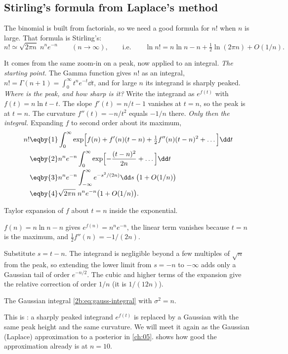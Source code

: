 \subsection{Stirling's formula from Laplace's method}
\label{2b:sec:stirling}

The binomial is built from factorials, so we need a good formula for $n!$ when $n$ is large. That formula is Stirling's:
\begin{equation}
  n! \simeq \sqrt{2\pi n}\;n^n e^{-n}\qquad (n\to\infty),
  \qquad\text{i.e.}\qquad
  \ln n! = n\ln n-n+\tfrac12\ln(2\pi n)+O(1/n) .
  \label{2b:eq:stirling}
\end{equation}

It comes from the same zoom-in on a peak, now applied to an integral. \emph{The starting point.} The Gamma function gives $n!$ as an integral, $n!=\Gamma(n+1)=\int_0^\infty t^n e^{-t}\dd t$, and for large $n$ its integrand is sharply peaked. \emph{Where is the peak, and how sharp is it?} Write the integrand as $e^{f(t)}$ with $f(t)=n\ln t-t$. The slope $f'(t)=n/t-1$ vanishes at $t=n$, so the peak is at $t=n$. The curvature $f''(t)=-n/t^2$ equals $-1/n$ there. \emph{Only then the integral.} Expanding $f$ to second order about its maximum,
\begin{align}
  n!
  &\eqby{1} \int_0^\infty \exp\Bigl[f(n)+f'(n)(t-n)+\tfrac12 f''(n)(t-n)^2+\dots\Bigr]\dd t \nonumber\\
  &\eqby{2} n^n e^{-n}\int_0^\infty \exp\Bigl[-\frac{(t-n)^2}{2n}+\dots\Bigr]\dd t \nonumber\\
  &\eqby{3} n^n e^{-n}\int_{-\infty}^{\infty} e^{-s^2/(2n)}\dd s\;\bigl(1+O(1/n)\bigr) \nonumber\\
  &\eqby{4} \sqrt{2\pi n}\;n^n e^{-n}\bigl(1+O(1/n)\bigr) .
  \label{2b:eq:stirling-derivation}
\end{align}
\begin{explain}
  \item Taylor expansion of $f$ about $t=n$ inside the exponential.
  \item $f(n)=n\ln n-n$ gives $e^{f(n)}=n^ne^{-n}$, the linear term vanishes because $t=n$ is the maximum, and $\tfrac12f''(n)=-1/(2n)$.
  \item Substitute $s=t-n$. The integrand is negligible beyond a few multiples of $\sqrt n$ from the peak, so extending the lower limit from $s=-n$ to $-\infty$ adds only a Gaussian tail of order $e^{-n/2}$. The cubic and higher terms of the expansion give the relative correction of order $1/n$ (it is $1/(12n)$).
  \item The Gaussian integral \eqref{2b:eq:gauss-integral} with $\sigma^2=n$.
\end{explain}
This is : a sharply peaked integrand $e^{f(t)}$ is replaced by a Gaussian with the same peak height and the same curvature. We will meet it again as the Gaussian (Laplace) approximation to a posterior in \cref{ch:05}.  shows how good the approximation already is at $n=10$.

